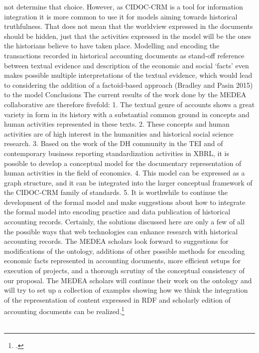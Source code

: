 \documentclass[12pt,a4paper]{article}
\begin{document}
not determine that choice. However, as CIDOC-CRM is a tool for information integration it is
more common to use it for models aiming towards historical truthfulness. That does not mean
that the worldview expressed in the documents should be hidden, just that the activities
expressed in the model will be the ones the historians believe to have taken place. Modelling and
encoding the transactions recorded in historical accounting documents as stand-off reference
between textual evidence and description of the economic and social ‘facts’ even makes possible
multiple interpretations of the textual evidence, which would lead to considering the addition of
a factoid-based approach (Bradley and Pasin 2015) to the model
Conclusions
The current results of the work done by the MEDEA collaborative are therefore fivefold:
1. The textual genre of accounts shows a great variety in form in its history with a
substantial common ground in concepts and human activities represented in these texts.
2. These concepts and human activities are of high interest in the humanities and historical
social science research.
3. Based on the work of the DH community in the TEI and of contemporary business
reporting standardization activities in XBRL, it is possible to develop a conceptual model
for the documentary representation of human activities in the field of economics.
4. This model can be expressed as a graph structure, and it can be integrated into the larger
conceptual framework of the CIDOC-CRM family of standards.
5. It is worthwhile to continue the development of the formal model and make suggestions
about how to integrate the formal model into encoding practice and data publication of
historical accounting records.
Certainly, the solutions discussed here are only a few of all the possible ways that web
technologies can enhance research with historical accounting records. The MEDEA scholars
look forward to suggestions for modifications of the ontology, additions of other possible
methods for encoding economic facts represented in accounting documents, more efficient setups
for execution of projects, and a thorough scrutiny of the conceptual consistency of our proposal.
The MEDEA scholars will continue their work on the ontology and will try to set up a collection
of examples showing how we think the integration of the representation of content expressed in
RDF and scholarly edition of accounting documents can be realized.\footcite[][S.9-12]{tomasekmedea}
\\
\\
\end{document}
